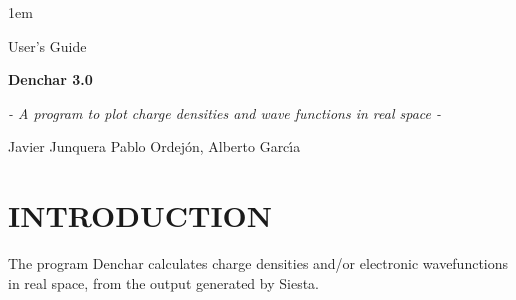 %
%
%



\textheight 22cm
\textwidth 16cm
\oddsidemargin 1mm
\topmargin -15mm

\baselineskip=14pt
\parskip 5pt
\parindent 1em




\begin{titlepage}

\begin{center}

\vspace{1cm}

{\huge {\sc User's Guide}}

\vspace{4cm}

{\Huge {\bf {\sc Denchar} 3.0} }

\vspace{0.5 cm}

{\Large {\it - A program to plot charge densities and wave functions 
in real space -}}


\vspace{3cm}
{\Large Javier Junquera}
\vspace{1cm}
{\Large Pablo Ordej\'on, Alberto Garc\'{\i}a}
\end{center}

\end{titlepage}


\tableofcontents

\newpage


\section{INTRODUCTION}

The program {\sc Denchar} calculates charge densities and/or electronic 
wavefunctions in real space, from the output generated by {\sc Siesta}.

